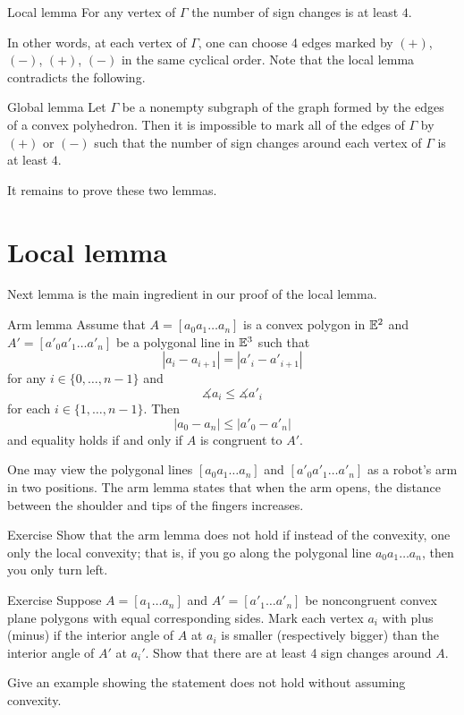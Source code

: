\begin{thm}{Local lemma}\label{lem:local}
For any vertex of $\Gamma$ the number of sign changes is at least $4$.
\end{thm}

In other words, at each vertex of $\Gamma$, one can choose 4 edges marked by $(+)$, $(-)$, $(+)$, $(-)$ in the same cyclical order.
Note that the local lemma contradicts the following.

\begin{thm}{Global lemma}\label{lem:global}
Let $\Gamma$ be a nonempty subgraph of the graph formed by the edges of a convex polyhedron. Then it is impossible to mark all of the edges of $\Gamma$ by $(+)$ or $(-)$ 
such that the number of sign changes around each vertex of $\Gamma$ is at least $4$.
\end{thm}

It remains to prove these two lemmas.
\qeds


\section{Local lemma}

Next lemma is the main ingredient in our proof of the local lemma.

\begin{thm}{Arm lemma}\label{lem:arm}
Assume that $A=[a_0 a_1\dots a_n]$ is a convex polygon in $\mathbb{E}^2$
and $A'=[a'_0 a'_1\dots a'_n]$ be a polygonal line in $\mathbb{E}^3$
such that 
$$|a_i-a_{i+1}|=|a'_i-a'_{i+1}|$$ for any $i\in\{0,\dots,n-1\}$
and 
$$\measuredangle a_i\le \measuredangle a'_i$$ 
for each $i\in\{1,\dots,n-1\}$.
Then 
$$|a_0-a_n|\le |a'_0-a'_n|$$
and equality holds if and only if $A$ is congruent to $A'$.
\end{thm}

One may view the polygonal lines $[a_0a_1\dots a_n]$ and $[a'_0a'_1\dots a'_n]$ as a robot's arm in two positions.
The arm lemma states that when the arm opens, 
the distance between the shoulder and tips of the fingers increases. 

\begin{thm}{Exercise}
Show that the arm lemma does not hold if 
instead of the convexity,
one only the local convexity;
that is, if you go along the polygonal line $a_0 a_1\dots a_n$, then you only turn left.
\end{thm}

\begin{thm}{Exercise}\label{ex:cauchy}
Suppose $A=[a_1\dots a_n]$ and $A'=[a'_1\dots a'_n]$ be noncongruent convex plane polygons with equal corresponding sides.
Mark each vertex $a_i$ with plus (minus) if the interior angle of $A$ at $a_i$ is smaller (respectively bigger) than the interior angle of $A'$ at $a_i'$.
Show that there are at least 4 sign changes around $A$. %

Give an example showing the statement does not hold without assuming convexity.

\end{thm}


